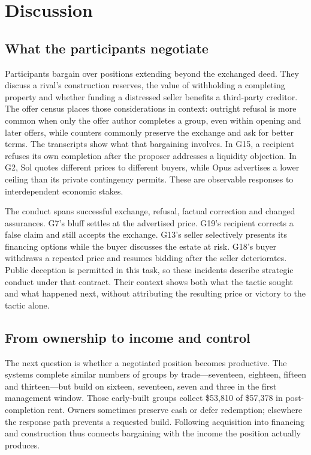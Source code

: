 \section{Discussion}
\label{sec:discussion}

\subsection{What the participants negotiate}

Participants bargain over positions extending beyond the exchanged deed. They discuss a rival's construction reserves, the value of withholding a completing property and whether funding a distressed seller benefits a third-party creditor. The offer census places those considerations in context: outright refusal is more common when only the offer author completes a group, even within opening and later offers, while counters commonly preserve the exchange and ask for better terms. The transcripts show what that bargaining involves. In G15, a recipient refuses its own completion after the proposer addresses a liquidity objection. In G2, Sol quotes different prices to different buyers, while Opus advertises a lower ceiling than its private contingency permits. These are observable responses to interdependent economic stakes.

The conduct spans successful exchange, refusal, factual correction and changed assurances. G7's bluff settles at the advertised price. G19's recipient corrects a false claim and still accepts the exchange. G13's seller selectively presents its financing options while the buyer discusses the estate at risk. G18's buyer withdraws a repeated price and resumes bidding after the seller deteriorates. Public deception is permitted in this task, so these incidents describe strategic conduct under that contract. Their context shows both what the tactic sought and what happened next, without attributing the resulting price or victory to the tactic alone.

\subsection{From ownership to income and control}

The next question is whether a negotiated position becomes productive. The systems complete similar numbers of groups by trade---seventeen, eighteen, fifteen and thirteen---but build on sixteen, seventeen, seven and three in the first management window. Those early-built groups collect \$53,810 of \$57,378 in post-completion rent. Owners sometimes preserve cash or defer redemption; elsewhere the response path prevents a requested build. Following acquisition into financing and construction thus connects bargaining with the income the position actually produces.

